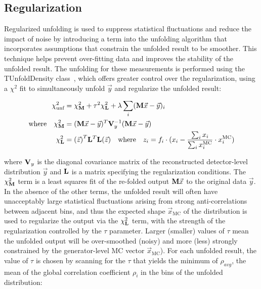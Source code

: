 \subsection{Regularization}
\label{Regularization}
Regularized unfolding is used to suppress statistical fluctuations and reduce the impact of noise by introducing a term into the unfolding algorithm that incorporates assumptions that constrain the unfolded result to be smoother.
This technique helps prevent over-fitting data and improves the stability of the unfolded result.
The unfolding for these measurements is performed using the TUnfoldDensity class~\cite{TUnfold}, which offers greater control over the regularization, using a $\chi^{2}$ fit to simultaneously unfold $\vec{y}$ and regularize the unfolded result:
\begin{linenomath*}
\begin{align}
\chi^{2}_{\text{unf}}&=\chi^{2}_{\mathbf{M}}+\tau^{2}\chi^{2}_{\mathbf{L}}+\lambda\sum_{i}(\mathbf{M}\vec{x}-\vec{y})_{i} \\
\mathrm{where \quad} \chi^{2}_{\mathbf{M}}&=(\mathbf{M}\vec{x}-\vec{y})^{T}\mathbf{V}_{y}^{-1}(\mathbf{M}\vec{x}-\vec{y}) \\
\chi^{2}_{\mathbf{L}}&={(\vec{z})}^{T}\mathbf{L}^{T}\mathbf{L}{(\vec{z})} \quad \text{where} \quad z_i = f_i \cdot (x_i - \frac{\sum_i x_i}{\sum_i x^{\text{MC}}_i} \cdot x^{\text{MC}}_i)
\label{eq:Chi2TUnfold}
\end{align}
\end{linenomath*}
where $\mathbf{V}_{y}$ is the diagonal covariance matrix of the reconstructed detector-level distribution $\vec{y}$ and $\mathbf{L}$ is a matrix specifying the regularization conditions.
The $\chi^{2}_{\mathbf{M}}$ term is a least squares fit of the re-folded output $\mathbf{M}\vec{x}$ to the original data $\vec{y}$.
In the absence of the other terms, the unfolded result will often have unacceptably large statistical fluctuations arising from strong anti-correlations between adjacent bins, and thus the expected shape $\vec{x}_{\text{MC}}$ of the distribution is used to regularize the output via the $\chi^{2}_{\mathbf{L}}$ term, with the strength of the regularization controlled by the $\tau$ parameter. 
Larger (smaller) values of $\tau$ mean the unfolded output will be over-smoothed (noisy) and more (less) strongly constrained by the generator-level MC vector $\vec{x}_{\text{MC}}$).
For each unfolded result, the value of $\tau$ is chosen by scanning for the $\tau$ that yields the minimum of $\rho_{avg}$, the mean of the global correlation coefficient $\rho_{i}$ in the bins of the unfolded distribution:
